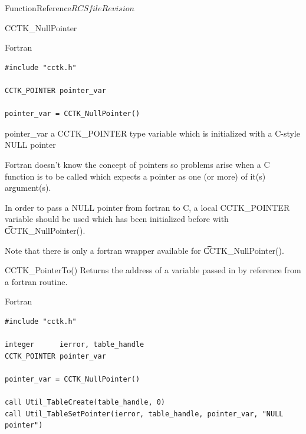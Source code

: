 \begin{cactuspart}{FunctionReference}{$RCSfile$}{$Revision$}
\begin{FunctionDescription}{CCTK\_NullPointer}
\begin{SynopsisSection}
\begin{Synopsis}{Fortran}
\begin{verbatim}
#include "cctk.h"

CCTK_POINTER pointer_var

pointer_var = CCTK_NullPointer()
\end{verbatim}
\end{Synopsis}
\end{SynopsisSection}

\begin{ResultSection}
\begin{Result}{pointer\_var}
a CCTK\_POINTER type variable which is initialized with a C-style NULL pointer
\end{Result}
\end{ResultSection}

\begin{Discussion}
Fortran doesn't know the concept of pointers so problems arise when a C function
is to be called which expects a pointer as one (or more) of it(s) argument(s).

In order to pass a NULL pointer from fortran to C, a local CCTK\_POINTER variable should be used which has been initialized before with {\t CCTK\_NullPointer()}.

Note that there is only a fortran wrapper available for {\t CCTK\_NullPointer()}.
\end{Discussion}

\begin{SeeAlsoSection}
\begin{SeeAlso}{CCTK\_PointerTo()}
Returns the address of a variable passed in by reference from a fortran routine.
\end{SeeAlso}
\end{SeeAlsoSection}

\begin{ExampleSection}
\begin{Example}{Fortran}
\begin{verbatim}
#include "cctk.h"

integer      ierror, table_handle
CCTK_POINTER pointer_var

pointer_var = CCTK_NullPointer()

call Util_TableCreate(table_handle, 0)
call Util_TableSetPointer(ierror, table_handle, pointer_var, "NULL pointer")
\end{verbatim}
\end{Example}
\end{ExampleSection}
\end{FunctionDescription}



\end{cactuspart}
